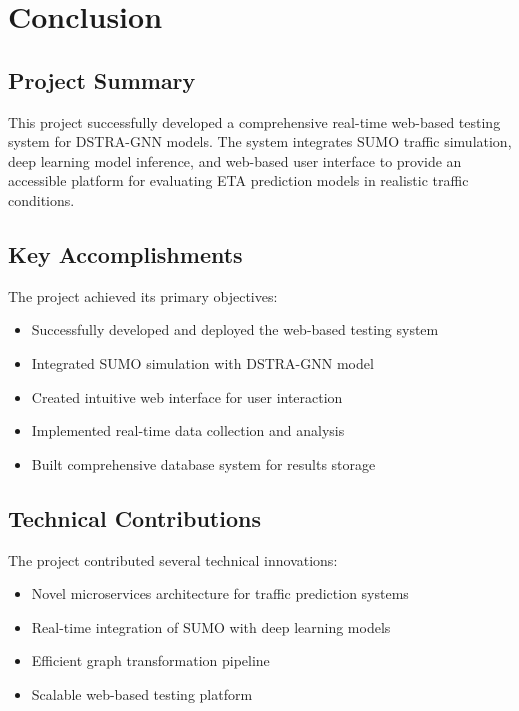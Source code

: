 \section{Conclusion}

\subsection{Project Summary}

This project successfully developed a comprehensive real-time web-based testing system for DSTRA-GNN models. The system integrates SUMO traffic simulation, deep learning model inference, and web-based user interface to provide an accessible platform for evaluating ETA prediction models in realistic traffic conditions.

\subsection{Key Accomplishments}

The project achieved its primary objectives:
\begin{itemize}
    \item Successfully developed and deployed the web-based testing system
    \item Integrated SUMO simulation with DSTRA-GNN model
    \item Created intuitive web interface for user interaction
    \item Implemented real-time data collection and analysis
    \item Built comprehensive database system for results storage
\end{itemize}

\subsection{Technical Contributions}

The project contributed several technical innovations:
\begin{itemize}
    \item Novel microservices architecture for traffic prediction systems
    \item Real-time integration of SUMO with deep learning models
    \item Efficient graph transformation pipeline
    \item Scalable web-based testing platform
\end{itemize}

